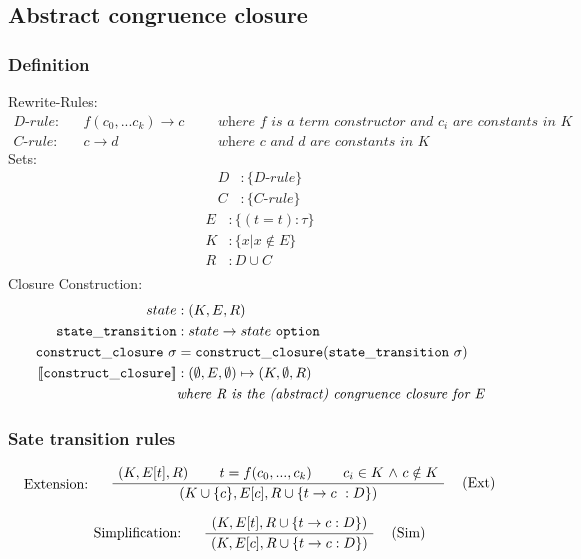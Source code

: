 \documentclass[twoside,a4paper]{article}
\theoremstyle{definition}
\begin{document}
\subsection{Abstract congruence closure \cite[p.~4--7]{BachmairTV03}}

\subsubsection{Definition}


Rewrite-Rules:
\begin{align*}
D\text{-}rule : &&f(c_0, ... c_k) \rightarrow c &&&\textit{where $f$ is a term constructor and $c_i$ are constants in $K$}
\\
C\text{-}rule : &&c \rightarrow d &&&\textit{where $c$ and $d$ are constants in $K$}
\end{align*}
Sets:
\begin{align*}
D &: \{D\text{-}rule\}\\
C &: \{C\text{-}rule\}
\end{align*}
\begin{align*}
E &: \{(t = t) : \tau\}\\
K &: \{ x | x \notin E\}\\
R &: D \cup C\\
\end{align*}
Closure Construction:
\begin{align*}
state &: (K,E,R)\\
{\tt state\_transition } &: state \rightarrow state {\tt ~option}\\
{\tt construct\_closure ~ }\sigma &= {\tt construct\_closure (state\_transition ~ }\sigma)\\
[\![ {\tt construct\_closure }]\!] &: (\emptyset , E , \emptyset) \mapsto (K , \emptyset , R)\\
&{\text{\it where R is the (abstract) congruence closure for E}}
\end{align*}

\subsubsection{Sate transition rules}

\[
\AxiomC{$(K,E[t],R)$}
\AxiomC{$t = f(c_0 , ... , c_k)$}
\AxiomC{$c_i \in K$ $\wedge$ $c \notin K$}
\LeftLabel{Extension: \quad}
\RightLabel{\quad (Ext)}
\TrinaryInfC{$(K \cup \{c\},E[c],R \cup \{t \rightarrow c\ : D\})$}
\DisplayProof
\]

\[
\AxiomC{$(K,E[t],R \cup \{t \rightarrow c : D\})$}
\LeftLabel{Simplification: \quad}
\RightLabel{\quad (Sim)}
\UnaryInfC{$(K,E[c],R \cup \{t \rightarrow c : D\})$}
\DisplayProof
\]
\end{document}
